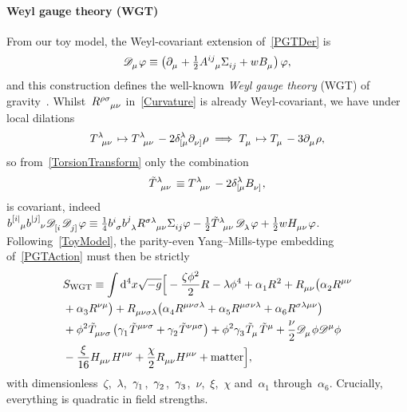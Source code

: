 \documentclass[aps,prd,reprint,preprintnumbers,showpacs,floatfix,nofootinbib,superscript address]{revtex4-2}
\begin{document}
\paragraph*{Weyl gauge theory (WGT)} From our toy model, the Weyl-covariant extension of~\cref{PGTDer} is 
\begin{equation}\label{WGTDer}
\SCovD{_\mu}\varphi\equiv\left(\PD{_\mu}+\tfrac{1}{2}\FieldA{^{ij}_\mu}\FieldSigma{_{ij}}+w\FieldV{_\mu}\right)\varphi,
\end{equation}
and this construction defines the well-known \emph{Weyl gauge theory} (WGT) of gravity~\cite{Weyl:1918ib,Weyl:1931}. Whilst~$\MAGF{^{\rho\sigma}_{\mu\nu}}$ in~\cref{Curvature} is already Weyl-covariant, we have under local dilations
\begin{equation}\label{TorsionTransform}
	\MAGT{^\lambda_{\mu\nu}}\mapsto \MAGT{^\lambda_{\mu\nu}}-2\FieldDelta{^\lambda_{[\mu}}\PD{_{\nu]}}\rho\implies\MAGT{_\mu}\mapsto\MAGT{_\mu}-3\PD{_\mu}\rho,
\end{equation}
so from~\cref{TorsionTransform} only the combination
\begin{equation}\label{TracelessTorsion}
\MAGTTilde{^\lambda_{\mu\nu}}\equiv\MAGT{^\lambda_{\mu\nu}}-2\FieldDelta{^\lambda_{[\mu}}\FieldV{_{\nu]}},
\end{equation}
is covariant, indeed~$\FieldB{^{[i|}_\mu}\FieldB{^{|j]}_\nu}\SCovD{_{[i}}\SCovD{_{j]}}\varphi\equiv\frac{1}{4}\FieldB{^{i}_\sigma}\FieldB{^j_\lambda}\MAGF{^{\sigma\lambda}_{\mu\nu}}\FieldSigma{_{ij}}\varphi-\frac{1}{2}\MAGTTilde{^\lambda_{\mu\nu}}\SCovD{_\lambda}\varphi+\frac{1}{2}w\MAGH{_{\mu\nu}}\varphi$. Following~\cref{ToyModel}, the parity-even Yang--Mills-type embedding of~\cref{PGTAction} must then be strictly
\begin{align}\label{WGTAction}
	&S_{\text{WGT}}\equiv\int\mathrm{d}^4x\sqrt{-g}\Big[
	-\frac{\zeta\phi^2}{2}\MAGF{}
	-\lambda\phi^4
	+\Alp{1}\MAGF{}^2
	+\MAGF{_{\mu\nu}}\big(
	\Alp{2}\MAGF{^{\mu\nu}}
	\nonumber\\ &
	+\Alp{3}\MAGF{^{\nu\mu}}\big)
	+\MAGF{_{\mu\nu\sigma\lambda}}\big(
	\Alp{4}\MAGF{^{\mu\nu\sigma\lambda}}
	+\Alp{5}\MAGF{^{\mu\sigma\nu\lambda}}
	+\Alp{6}\MAGF{^{\sigma\lambda\mu\nu}}\big)
	\nonumber\\ &
	+\phi^2\MAGTTilde{_{\mu\nu\sigma}}\big(\Gam{1}\MAGTTilde{^{\mu\nu\sigma}}
	+\Gam{2}\MAGTTilde{^{\nu\mu\sigma}}\big)
	+\phi^2\Gam{3}\MAGTTilde{_{\mu}}\MAGTTilde{^{\mu}}
	+\frac{\nu}{2}\SCovD{_\mu}\phi\SCovD{^\mu}\phi
	\nonumber\\ &
	-\frac{\xi}{16}\MAGH{_{\mu\nu}}\MAGH{^{\mu\nu}}
	+\frac{\chi}{2}\MAGF{_{\mu\nu}}\MAGH{^{\mu\nu}}
	+\text{matter}
	\Big],
\end{align}
with dimensionless~$\zeta$,~$\lambda$,~$\Gam{1}$,~$\Gam{2}$,~$\Gam{3}$,~$\nu$,~$\xi$,~$\chi$ and~$\alpha_1$ through~$\alpha_6$. Crucially, everything is quadratic in field strengths.
\end{document}

